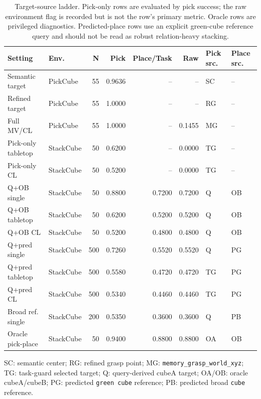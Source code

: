 \documentclass[conference]{IEEEtran}
\begin{document}
\begin{table}[t]
\centering
\caption{Target-source ladder. Pick-only rows are evaluated by pick success;
the raw environment flag is recorded but is not the row's primary metric.
Oracle rows are privileged diagnostics. Predicted-place rows use an explicit
green-cube reference query and should not be read as robust relation-heavy
stacking.}
\label{tab:target-source}
\scriptsize
\setlength{\tabcolsep}{2.4pt}
\begin{tabular}{llrrrrll}
\toprule
Setting & Env. & N & Pick & Place/Task & Raw & Pick src. & Place src. \\
\midrule
Semantic target & PickCube & 55 & 0.9636 & -- & -- & SC & -- \\
Refined target & PickCube & 55 & 1.0000 & -- & -- & RG & -- \\
Full MV/CL & PickCube & 55 & 1.0000 & -- & 0.1455 & MG & -- \\
Pick-only tabletop & StackCube & 50 & 0.6200 & -- & 0.0000 & TG & -- \\
Pick-only CL & StackCube & 50 & 0.5200 & -- & 0.0000 & TG & -- \\
Q+OB single & StackCube & 50 & 0.8800 & 0.7200 & 0.7200 & Q & OB \\
Q+OB tabletop & StackCube & 50 & 0.6200 & 0.5200 & 0.5200 & Q & OB \\
Q+OB CL & StackCube & 50 & 0.5200 & 0.4800 & 0.4800 & Q & OB \\
Q+pred single & StackCube & 500 & 0.7260 & 0.5520 & 0.5520 & Q & PG \\
Q+pred tabletop & StackCube & 500 & 0.5580 & 0.4720 & 0.4720 & TG & PG \\
Q+pred CL & StackCube & 500 & 0.5340 & 0.4460 & 0.4460 & TG & PG \\
Broad ref. single & StackCube & 200 & 0.5350 & 0.3600 & 0.3600 & Q & PB \\
Oracle pick-place & StackCube & 50 & 0.9400 & 0.8800 & 0.8800 & OA & OB \\
\bottomrule
\end{tabular}
\vspace{1mm}
\begin{minipage}{0.98\textwidth}
\scriptsize SC: semantic center; RG: refined grasp point; MG:
\texttt{memory\_grasp\_world\_xyz}; TG: task-guard selected target; Q:
query-derived cubeA target; OA/OB: oracle cubeA/cubeB; PG: predicted
\texttt{green cube} reference; PB: predicted broad \texttt{cube} reference.
\end{minipage}
\end{table}
\end{document}
